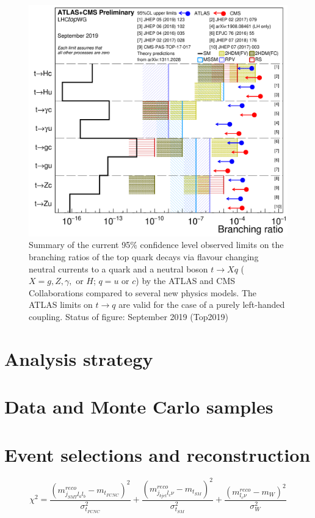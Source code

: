 \begin{figure}[htb]
	\centering
	\includegraphics[scale=0.15]{Chapters/CH5/figures/fcnc_summarybsm}
	\caption{Summary of the current 95\% confidence level observed limits on the branching ratios of the top quark decays via flavour changing neutral currents to a quark and a neutral boson $t\rightarrow Xq$ ($X = g, Z, \gamma,$ or $H$; $q = u$ or $c$) by the ATLAS and CMS Collaborations compared to several new physics models. The ATLAS limits on $t \rightarrow q$ are valid for the case of a purely left-handed coupling. Status of figure: September 2019 (Top2019)}
	\label{fig:intro:limits}
\end{figure}

\clearpage
\section{Analysis strategy}

\clearpage
\section{Data and Monte Carlo samples}

\clearpage
\section{Event selections and reconstruction}
\begin{equation}
\chi^2=\frac{  (m^{reco}_{j_{SMT}l_{a}l_{b}} -m_{t_{FCNC}})^2 }{\sigma^2_{t_{FCNC}}}   +\frac{  (m^{reco}_{j_{bjet}l_{c}\nu} -m_{t_{SM}})^2 }{\sigma^2_{t_{SM}}}+\frac{  (m^{reco}_{l_{c}\nu} -m_{W})^2 }{\sigma^2_{W}}
\end{equation}
\clearpage
